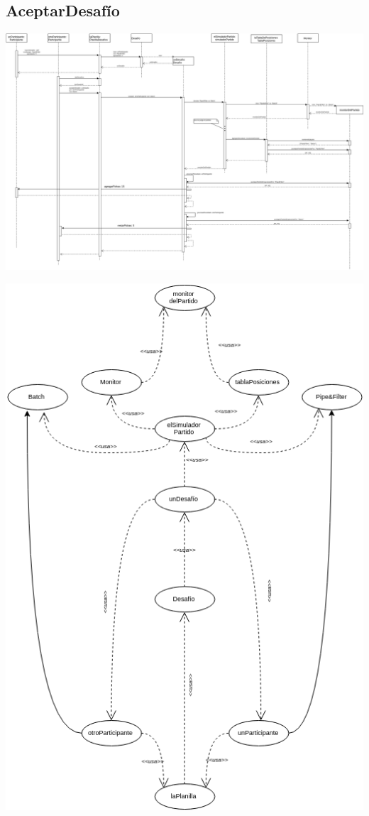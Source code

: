 \subsection{AceptarDesafío}


\includegraphics[width=\textwidth]{imgs/aceptarDesafioSecuencia.png}

\includegraphics[width=\textwidth]{imgs/aceptarDesafioObjetos.png}

